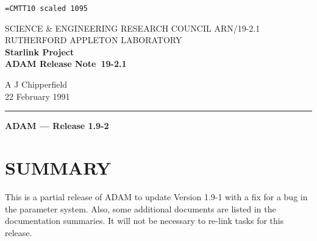 \pagestyle{myheadings}

\newcommand{\stardoccategory}  {ADAM Release Note}
\newcommand{\stardocinitials}  {ARN}
\newcommand{\stardocnumber}    {19-2.1}
\newcommand{\stardocauthors}   {A J Chipperfield}
\newcommand{\stardocdate}      {22 February 1991}
\newcommand{\stardoctitle}     {ADAM --- Release 1.9-2}

\newcommand{\stardocname}{\stardocinitials /\stardocnumber}
\markright{\stardocname}
\setlength{\textwidth}{160mm}
\setlength{\textheight}{240mm}
\setlength{\topmargin}{-5mm}
\setlength{\oddsidemargin}{0mm}
\setlength{\evensidemargin}{0mm}
\setlength{\parindent}{0mm}
\setlength{\parskip}{\medskipamount}
\setlength{\unitlength}{1mm}


\font\tt=CMTT10 scaled 1095
\renewcommand{\_}{{\tt\char'137}}


\thispagestyle{empty}
SCIENCE \& ENGINEERING RESEARCH COUNCIL \hfill \stardocname\\
RUTHERFORD APPLETON LABORATORY\\
{\large\bf Starlink Project\\}
{\large\bf \stardoccategory\ \stardocnumber}
\begin{flushright}
\stardocauthors\\
\stardocdate
\end{flushright}
\vspace{-4mm}
\rule{\textwidth}{0.5mm}
\vspace{5mm}
\begin{center}
{\Large\bf \stardoctitle}
\end{center}
\vspace{5mm}

\section{SUMMARY}
This is a partial release of ADAM to update Version 1.9-1 with a fix for a
bug in the parameter system. Also, some additional documents are listed in the
documentation summaries.
It will not be necessary to re-link tasks for this release.

